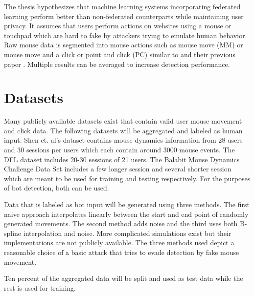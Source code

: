 \documentclass[
    fontsize=12pt,
    headings=small,
    parskip=half,           %
    bibliography=totoc,
    numbers=noenddot,       %
    open=any,               %
    ]{scrreprt}
\begin{document}
The thesis hypothesizes that machine learning systems incorporating federated learning perform better than non-federated counterparts while maintaining user privacy. It assumes that users perform actions on websites using a mouse or touchpad which are hard to fake by attackers trying to emulate human behavior. Raw mouse data is segmented into mouse actions such as mouse move (MM) or mouse move and a click or point and click (PC) similar to \cite{9111596} and their previous paper \cite{DBLP:journals/corr/abs-1810-04668}. Multiple results can be averaged to increase detection performance.

\section{Datasets}

Many publicly available datasets exist that contain valid user mouse movement and click data. The following datasets will be aggregated and labeled as human input.
Shen et. al's \cite{6263955} dataset contains mouse dynamics information from 28 users and 30 sessions per users which each contain around 3000 mouse events.
The DFL dataset \cite{9111596} includes 20-30 sessions of 21 users.
The Balabit Mouse Dynamics Challenge Data Set \cite{BALABIT_CHALLENGE} includes a few longer session and several shorter session which are meant to be used for training and testing respectively. For the purposes of bot detection, both can be used.



Data that is labeled as bot input will be generated using three methods. The first naive approach interpolates linearly between the start and end point of randomly generated movements. The second method adds noise and the third uses both B-spline interpolation and noise. More complicated simulations exist but their implementations are not publicly available. \cite{8275816} \cite{Nazar2003} The three methods used depict a reasonable choice of a basic attack that tries to evade detection by fake mouse movement.


Ten percent of the aggregated data will be split and used as test data while the rest is used for training.
\end{document}
